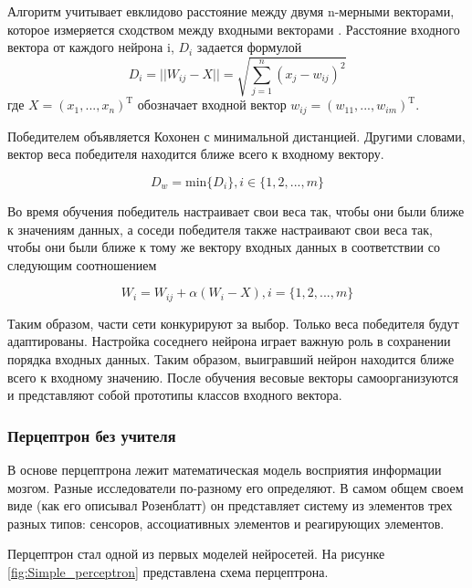 Алгоритм учитывает евклидово расстояние между двумя n-мерными векторами, которое измеряется сходством между входными векторами \cite{nizam2010kohonen}. Расстояние входного вектора от каждого нейрона i, $D_i$ задается формулой
\begin{equation}
	D_i = ||W_{ij} - X|| = \sqrt{\sum_{j=1}^{n}(x_j - w_{ij})^2}
\end{equation}
где $X = (x_1,...,x_n)^{\text{T}}$ обозначает входной вектор $w_{ij}=(w_{11},...,w_{im})^{\text{T}}$.

Победителем объявляется Кохонен с минимальной дистанцией. Другими словами, вектор веса победителя находится ближе всего к входному вектору.

\begin{equation}
	D_w = \text{min} \{D_i\}, i \in \{1,2,...,m\}
\end{equation}

Во время обучения победитель настраивает свои веса так, чтобы они были ближе к значениям данных, а соседи победителя также настраивают свои веса так, чтобы они были ближе к тому же вектору входных данных в соответствии со следующим соотношением

\begin{equation}
	W_i = W_{ij} + \alpha (W_i - X), i=\{1,2,...,m\}
\end{equation}

Таким образом, части сети конкурируют за выбор. Только веса победителя будут адаптированы. Настройка соседнего нейрона играет важную роль в сохранении порядка входных данных. Таким образом, выигравший нейрон находится ближе всего к входному значению. После обучения весовые векторы самоорганизуются и представляют собой прототипы классов входного вектора.

\subsubsection{Перцептрон без учителя}
В основе перцептрона лежит математическая модель восприятия информации мозгом. Разные исследователи по-разному его определяют. В самом общем своем виде (как его описывал Розенблатт) он представляет систему из элементов трех разных типов: сенсоров, ассоциативных элементов и реагирующих элементов.

Перцептрон стал одной из первых моделей нейросетей. На рисунке \ref{fig:Simple_perceptron} представлена схема перцептрона.

